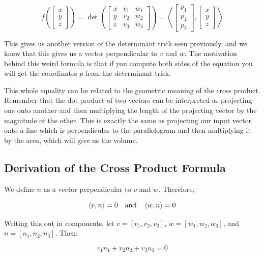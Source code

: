 \[
    f \left(
    \begin{bmatrix}
       x \\ y \\ z 
    \end{bmatrix}
    \right)
    = \det 
    \left(
        \begin{bmatrix}
            x & v_1 & w_1 \\ 
            y & v_2 & w_2 \\ 
            z & v_3 & w_3 
        \end{bmatrix}
    \right)
    =
    \left\langle
    \begin{bmatrix}
       p_1 \\ p_2 \\ p_3 
    \end{bmatrix}
    ,
    \begin{bmatrix}
       x \\ y \\ z 
    \end{bmatrix}
    \right\rangle
\]

This gives us another version of the determinant trick seen previously, and we know that this gives us a vector perpendicular to \(v\) and 
\(w\). The motivation behind this weird formula is that if you compute both sides of the equation you will get the coordinates \(p\) 
from the determinant trick. 

This whole equality can be related to the geometric meaning of the cross product. Remember that the dot product of two vectors can be 
interpreted as projecting one onto another and then multiplying the length of the projecting vector by the magnitude of the other. This is exactly the same 
as projecting our input vector onto a line which is perpendicular to the parallelogram and then multiplying it by the area, which will give us the 
volume. 

\subsection{Derivation of the Cross Product Formula}

We define \(n\) as a vector perpendicular to \(v\) and \(w\). Therefore, 

\[
    \left\langle v, n\right\rangle = 0 \quad \text{and} \quad \left\langle w, n\right\rangle = 0
\]

Writing this out in components, let \(v = [v_1, v_2, v_3]\), \(w = [w_1, w_2, w_3]\), and \(n = [n_1, n_2, n_3]\). Then:

\[
    v_1 n_1 + v_2 n_2 + v_3 n_3 = 0
\]


